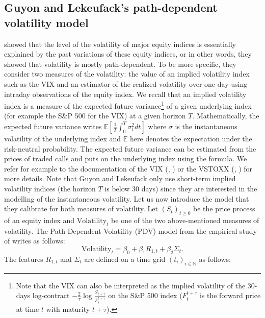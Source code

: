 \subsection{Guyon and Lekeufack's path-dependent volatility model}\label{sec:pdv_model}
\cite{guyon2022volatility} showed that the level of the volatility of major equity indices is essentially explained by the past variations of these equity indices, or in other words, they showed that volatility is mostly path-dependent. To be more specific, they consider two measures of the volatility: the value of an implied volatility index such as the VIX and an estimator of the realized volatility over one day using intraday observations of the equity index. We recall that an implied volatility index is a measure of the expected future variance\footnote{Note that the VIX can also be interpreted as the implied volatility of the 30-days log-contract $-\frac{2}{\tau}\log \frac{S_{t+\tau}}{F_t^{t+\tau}}$ on the S\&P 500 index ($F_t^{t+\tau}$ is the forward price at time $t$ with maturity $t+\tau$). } of a given underlying index (for example the S\&P 500 for the VIX) at a given horizon $T$. Mathematically, the expected future variance writes $\mathbb{E}\left[\frac{1}{T}\int_0^T \sigma_t^2 dt \right]$ where $\sigma$ is the instantaneous volatility of the underlying index and $\mathbb{E}$ here denotes the expectation under the risk-neutral probability. The expected future variance can be estimated from the prices of traded calls and puts on the underlying index using the \cite{carr2001formula} formula. We refer for example to the documentation of the VIX (\citeauthor{vixwp}, \citeyear{vixwp}) or the VSTOXX (\citeauthor{vstoxxwp}, \citeyear{vstoxxwp}) for more details. Note that Guyon and Lekeufack only use short-term implied volatility indices (the horizon $T$ is below 30 days) since they are interested in the modelling of the instantaneous volatility. Let us now introduce the model that they calibrate for both measures of volatility. Let $(S_t)_{t\ge 0}$ be the price process of an equity index and $\text{Volatility}_t$ be one of the two above-mentioned measures of volatility. The Path-Dependent Volatility (PDV) model from the empirical study of \cite{guyon2022volatility} writes as follows:
\begin{equation}\label{eq:guyon_model}
    \text{Volatility}_t = \beta_0+\beta_1 R_{1,t} + \beta_2\Sigma_t.
\end{equation}
The features $R_{1,t}$ and $\Sigma_t$ are defined on a time grid $(t_i)_{i\in \mathbb{N}}$ as follows:
